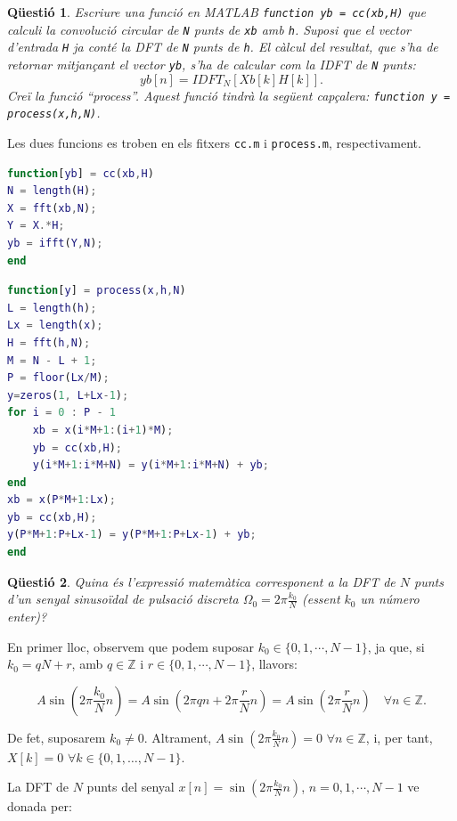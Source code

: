 \documentclass[11pt,a4]{article}
\numberwithin{equation}{section}
\theoremstyle{thmstyle}
\theoremstyle{thmstyle}
\theoremstyle{thmstyle}
\theoremstyle{thmstyle}
\theoremstyle{thmstyle}
\theoremstyle{thmstyle}
\newtheorem{question}{Qüestió}
\theoremstyle{thmstyle}
\begin{document}
\begin{question}
Escriure una funció en MATLAB {\tt function yb = cc(xb,H)} que calculi la convolució circular de {\tt N} punts de {\tt xb} amb {\tt h}. Suposi que el vector d'entrada {\tt H} ja conté la DFT de {\tt N} punts de {\tt h}. El càlcul del resultat, que s'ha de retornar mitjançant el vector {\tt yb}, s'ha de calcular com la IDFT de {\tt N} punts:
$$
yb[n] = IDFT_N [Xb[k]H[k]].
$$
Creï la funció ``process''. Aquest funció tindrà la següent capçalera: {\tt function y = process(x,h,N)}.
\end{question}

Les dues funcions es troben en els fitxers {\tt cc.m} i {\tt process.m}, respectivament.

\begin{lstlisting}[language=MATLAB]
function[yb] = cc(xb,H)
N = length(H);
X = fft(xb,N);
Y = X.*H;
yb = ifft(Y,N);
end
\end{lstlisting}

\begin{lstlisting}[language=MATLAB]
function[y] = process(x,h,N)
L = length(h);
Lx = length(x);
H = fft(h,N);
M = N - L + 1;
P = floor(Lx/M);
y=zeros(1, L+Lx-1);
for i = 0 : P - 1
    xb = x(i*M+1:(i+1)*M);
    yb = cc(xb,H);
    y(i*M+1:i*M+N) = y(i*M+1:i*M+N) + yb;
end
xb = x(P*M+1:Lx);
yb = cc(xb,H);
y(P*M+1:P+Lx-1) = y(P*M+1:P+Lx-1) + yb;
end
\end{lstlisting}

\begin{question}
Quina és l'expressió matemàtica corresponent a la DFT de $N$ punts d'un senyal sinusoïdal de pulsació discreta $\Omega_0=2\pi\frac{k_0}{N}$ (essent $k_0$ un número enter)?
\end{question}

En primer lloc, observem que podem suposar $k_0\in\lbrace 0,1,\cdots,N-1\rbrace$, ja que, si $k_0=qN+r$, amb $q\in\mathbb{Z}$ i $r\in\lbrace 0,1,\cdots,N-1\rbrace$, llavors:

$$
A\sin(2\pi\frac{k_0}{N}n) = A\sin(2\pi qn + 2\pi\frac{r}{N}n) = A\sin(2\pi\frac{r}{N}n) \quad \forall n\in\mathbb{Z}.
$$

De fet, suposarem $k_0\neq 0$. Altrament, $A\sin(2\pi\frac{k_0}{N}n)=0$ $\forall n\in\mathbb{Z}$, i, per tant, $X[k]=0$ $\forall k\in\lbrace 0,1,\ldots,N-1\rbrace$.

La DFT de $N$ punts del senyal $x[n]=\sin(2\pi\frac{k_0}{N}n)$, $n=0,1,\cdots, N-1$ ve donada per:
\end{document}
